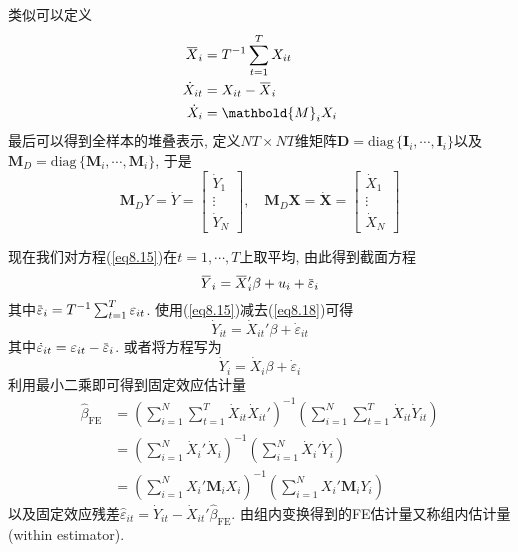 \documentclass[cn, 12pt, math=mtpro2, bibstyle=apa, blue, twocol]{elegantbook}
\newcommand{\X}{\mathbold{X}}
\newcommand{\hb}{\hat{\beta}}
\newcommand{\overbar}[1]{\mkern 1.5mu\overline{\mkern-1.5mu#1\mkern-1.5mu}\mkern 1.5mu}
\begin{document}
类似可以定义
\begin{align*}
\overbar{X}_i&=T^{-1}\sum_{t=1}^{T}X_{it} \\
\dot{X}_{it}&=X_{it}-\overbar{X}_i \\
\dot{X}_i&=\mathbold{M}_iX_i
\end{align*}
最后可以得到全样本的堆叠表示, 定义$NT\times NT$维矩阵$\mathbold{D}=\text{diag}\,\{\mathbold{I}_i,\cdots,\mathbold{I}_i\}$以及$\mathbold{M}_D=\text{diag}\,\{\mathbold{M}_i,\cdots,\mathbold{M}_i\}$, 于是
$$\mathbold{M}_DY=\dot{Y}=\begin{bmatrix}
                            \dot{Y}_1 \\
                            \vdots \\
                            \dot{Y}_N
                          \end{bmatrix},\quad \mathbold{M}_D\X=\dot{\X}=\begin{bmatrix}
                                                                          \dot{X}_1 \\
                                                                          \vdots \\
                                                                          \dot{X}_N
                                                                        \end{bmatrix}$$

现在我们对方程(\ref{eq8.15})在$t=1,\cdots,T$上取平均, 由此得到截面方程
\begin{equation}\label{eq8.18}
  \overbar{Y}_i=\overbar{X}_i'\beta+u_i+\overbar{\varepsilon}_i
\end{equation}
其中$\overbar{\varepsilon}_i=T^{-1}\sum_{t=1}^{T}\varepsilon_{it}$. 使用(\ref{eq8.15})减去(\ref{eq8.18})可得
$$\dot{Y}_{it}=\dot{X}_{it}'\beta+\dot{\varepsilon}_{it}$$
其中$\dot{\varepsilon}_{it}=\varepsilon_{it}-\overbar{\varepsilon}_i$. 或者将方程写为
$$\dot{Y}_i=\dot{X}_i\beta+\dot{\varepsilon}_i$$
利用最小二乘即可得到固定效应估计量
\begin{align*}
\hb_{\text{FE}}&=\left(\sum_{i=1}^{N}\sum_{t=1}^{T}\dot{X}_{it}\dot{X}_{it}'\right)^{-1}\left(\sum_{i=1}^{N}\sum_{t=1}^{T}\dot{X}_{it}\dot{Y}_{it}\right) \\
&=\left(\sum_{i=1}^{N}\dot{X}_i'\dot{X}_i\right)^{-1}\left(\sum_{i=1}^{N}\dot{X}_i'\dot{Y}_i\right) \\
&=\left(\sum_{i=1}^{N}X_i'\mathbold{M}_iX_i\right)^{-1}\left(\sum_{i=1}^{N}X_i'\mathbold{M}_iY_i\right)
\end{align*}
以及固定效应残差$\hat{\varepsilon}_{it}=\dot{Y}_{it}-\dot{X}_{it}'\hb_{\text{FE}}$. 由组内变换得到的FE估计量又称组内估计量 (within estimator).
\end{document}
